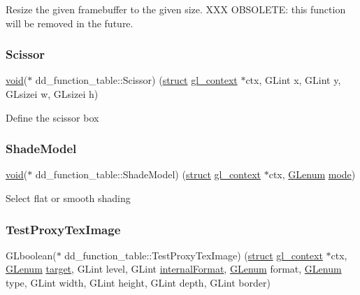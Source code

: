 Resize the given framebuffer to the given size. X\+XX O\+B\+S\+O\+L\+E\+TE\+: this function will be removed in the future. \mbox{\label{structdd__function__table_a73e64b5bab55c1588ff9b58f21249f60}} 
\subsubsection{\texorpdfstring{Scissor}{Scissor}}
{\footnotesize\ttfamily \hyperlink{interfacevoid}{void}($\ast$ dd\+\_\+function\+\_\+table\+::\+Scissor) (\hyperlink{interfacestruct}{struct} \hyperlink{structgl__context}{gl\+\_\+context} $\ast$ctx, G\+Lint x, G\+Lint y, G\+Lsizei w, G\+Lsizei h)}

Define the scissor box \mbox{\label{structdd__function__table_a516726131e38d6075ce43582d23eb2b5}} 
\subsubsection{\texorpdfstring{Shade\+Model}{ShadeModel}}
{\footnotesize\ttfamily \hyperlink{interfacevoid}{void}($\ast$ dd\+\_\+function\+\_\+table\+::\+Shade\+Model) (\hyperlink{interfacestruct}{struct} \hyperlink{structgl__context}{gl\+\_\+context} $\ast$ctx, \hyperlink{interfacevoid}{G\+Lenum} \hyperlink{interfacevoid}{mode})}

Select flat or smooth shading \mbox{\label{structdd__function__table_a6bde3f45be48a994c069fd106d1add4e}} 
\subsubsection{\texorpdfstring{Test\+Proxy\+Tex\+Image}{TestProxyTexImage}}
{\footnotesize\ttfamily G\+Lboolean($\ast$ dd\+\_\+function\+\_\+table\+::\+Test\+Proxy\+Tex\+Image) (\hyperlink{interfacestruct}{struct} \hyperlink{structgl__context}{gl\+\_\+context} $\ast$ctx, \hyperlink{interfacevoid}{G\+Lenum} \hyperlink{interfacevoid}{target}, G\+Lint level, G\+Lint \hyperlink{interfacevoid}{internal\+Format}, \hyperlink{interfacevoid}{G\+Lenum} format, \hyperlink{interfacevoid}{G\+Lenum} type, G\+Lint width, G\+Lint height, G\+Lint depth, G\+Lint border)}

